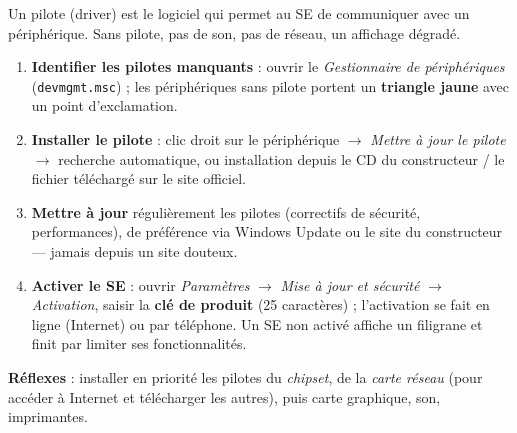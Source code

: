 \documentclass[11pt]{article}
\newcommand{\cle}[1]{{\popxbold\color{popdark}#1}}
\begin{document}
\begin{methode}
Un \cle{pilote} (driver) est le logiciel qui permet au SE de communiquer avec un périphérique. Sans pilote, pas de son, pas de réseau, un affichage dégradé.
\begin{enumerate}
\item \textbf{Identifier les pilotes manquants} : ouvrir le \emph{Gestionnaire de périphériques} (\texttt{devmgmt.msc}) ; les périphériques sans pilote portent un \textbf{triangle jaune} avec un point d'exclamation.
\item \textbf{Installer le pilote} : clic droit sur le périphérique $\to$ \emph{Mettre à jour le pilote} $\to$ recherche automatique, ou installation depuis le CD du constructeur / le fichier téléchargé sur le site officiel.
\item \textbf{Mettre à jour} régulièrement les pilotes (correctifs de sécurité, performances), de préférence via Windows Update ou le site du constructeur — jamais depuis un site douteux.
\item \textbf{Activer le SE} : ouvrir \emph{Paramètres} $\to$ \emph{Mise à jour et sécurité} $\to$ \emph{Activation}, saisir la \textbf{clé de produit} (25 caractères) ; l'activation se fait en ligne (Internet) ou par téléphone. Un SE non activé affiche un filigrane et finit par limiter ses fonctionnalités.
\end{enumerate}
\textbf{Réflexes} : installer en priorité les pilotes du \emph{chipset}, de la \emph{carte réseau} (pour accéder à Internet et télécharger les autres), puis carte graphique, son, imprimantes.
\end{methode}
\end{document}
